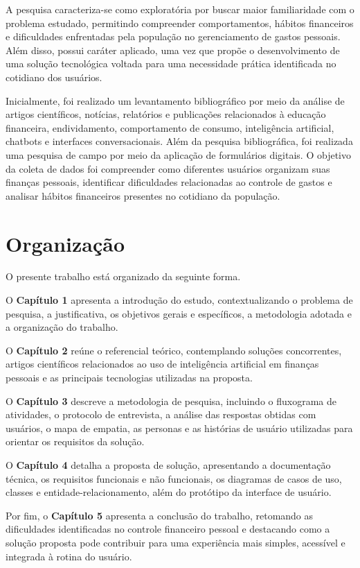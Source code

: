 A pesquisa caracteriza-se como exploratória por buscar maior familiaridade com o problema estudado, permitindo compreender comportamentos, hábitos financeiros e dificuldades enfrentadas pela população no gerenciamento de gastos pessoais. Além disso, possui caráter aplicado, uma vez que propõe o desenvolvimento de uma solução tecnológica voltada para uma necessidade prática identificada no cotidiano dos usuários.

Inicialmente, foi realizado um levantamento bibliográfico por meio da análise de artigos científicos, notícias, relatórios e publicações relacionados à educação financeira, endividamento, comportamento de consumo, inteligência artificial, chatbots e interfaces conversacionais. Além da pesquisa bibliográfica, foi realizada uma pesquisa de campo por meio da aplicação de formulários digitais. O objetivo da coleta de dados foi compreender como diferentes usuários organizam suas finanças pessoais, identificar dificuldades relacionadas ao controle de gastos e analisar hábitos financeiros presentes no cotidiano da população.

\section{Organização}

O presente trabalho está organizado da seguinte forma.

O \textbf{Capítulo 1} apresenta a introdução do estudo, contextualizando o problema de pesquisa, a justificativa, os objetivos gerais e específicos, a metodologia adotada e a organização do trabalho.

O \textbf{Capítulo 2} reúne o referencial teórico, contemplando soluções concorrentes, artigos científicos relacionados ao uso de inteligência artificial em finanças pessoais e as principais tecnologias utilizadas na proposta.

O \textbf{Capítulo 3} descreve a metodologia de pesquisa, incluindo o fluxograma de atividades, o protocolo de entrevista, a análise das respostas obtidas com usuários, o mapa de empatia, as personas e as histórias de usuário utilizadas para orientar os requisitos da solução.

O \textbf{Capítulo 4} detalha a proposta de solução, apresentando a documentação técnica, os requisitos funcionais e não funcionais, os diagramas de casos de uso, classes e entidade-relacionamento, além do protótipo da interface de usuário.

Por fim, o \textbf{Capítulo 5} apresenta a conclusão do trabalho, retomando as dificuldades identificadas no controle financeiro pessoal e destacando como a solução proposta pode contribuir para uma experiência mais simples, acessível e integrada à rotina do usuário.

